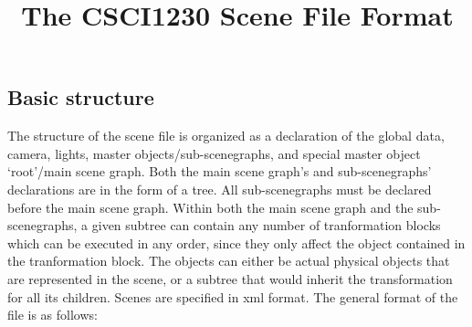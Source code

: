 \documentclass{scrartcl}
\begin{document}
\title{\vspace{-3cm}The CSCI1230 Scene File Format\vspace{-2.5em}}
\author{}
\date{}

\maketitle
\subsection*{Basic structure}

The structure of the scene file is organized as a declaration of the global data, camera, lights, master
objects/sub-scenegraphs, and special master object `root'/main scene graph. Both the main scene graph's
and sub-scenegraphs' declarations are in the form of a tree. All sub-scenegraphs must be declared before the
main scene graph. Within both the main scene graph and the sub-scenegraphs, a given subtree can contain
any number of tranformation blocks which can be executed in any order, since they only affect the object
contained in the tranformation block. The objects can either be actual physical objects that are represented
in the scene, or a subtree that would inherit the transformation for all its children. Scenes are specified in
xml format. The general format of the file is as follows:
\end{document}
